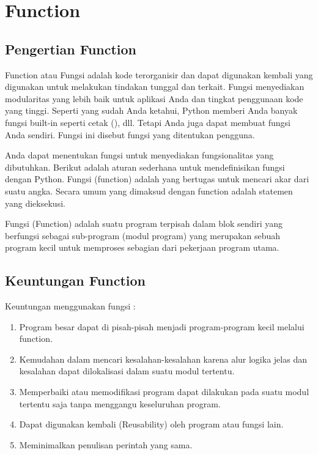 \section{Function}
\subsection{Pengertian Function}
Function atau Fungsi adalah kode terorganisir dan dapat digunakan kembali yang digunakan untuk melakukan tindakan tunggal dan terkait. 
Fungsi menyediakan modularitas yang lebih baik untuk aplikasi Anda dan tingkat penggunaan kode yang tinggi. Seperti yang sudah Anda ketahui, 
Python memberi Anda banyak fungsi built-in seperti cetak (), dll. Tetapi Anda juga dapat membuat fungsi Anda sendiri. 
Fungsi ini disebut fungsi yang ditentukan pengguna.

Anda dapat menentukan fungsi untuk menyediakan fungsionalitas yang dibutuhkan. Berikut adalah aturan sederhana untuk mendefinisikan fungsi dengan Python. 
Fungsi (function) adalah yang bertugas untuk mencari akar dari suatu angka. Secara umum yang dimaksud dengan function adalah statemen
yang dieksekusi. 


Fungsi (Function) adalah suatu program terpisah dalam blok sendiri yang berfungsi sebagai sub-program (modul program) yang merupakan sebuah program kecil untuk memproses sebagian dari pekerjaan program utama.

\subsection{Keuntungan Function}
Keuntungan menggunakan fungsi :
\begin{enumerate}
\item
Program besar dapat di pisah-pisah menjadi program-program kecil melalui function.
\item
Kemudahan dalam mencari kesalahan-kesalahan karena alur logika jelas dan kesalahan
dapat dilokalisasi dalam suatu modul tertentu.
\item
Memperbaiki atau memodifikasi program dapat dilakukan pada suatu modul tertentu saja
tanpa menggangu keseluruhan program.
\item
Dapat digunakan kembali (Reusability) oleh program atau fungsi lain.
\item
Meminimalkan penulisan perintah yang sama.
\end{enumerate}

